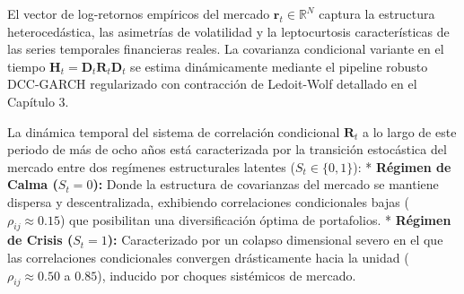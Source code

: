 \documentclass[
  12pt,
]{article}
\begin{document}
El vector de log-retornos empíricos del mercado
\(\mathbf{r}_t \in \mathbb{R}^N\) captura la estructura heterocedástica,
las asimetrías de volatilidad y la leptocurtosis características de las
series temporales financieras reales. La covarianza condicional variante
en el tiempo \(\mathbf{H}_t = \mathbf{D}_t \mathbf{R}_t \mathbf{D}_t\)
se estima dinámicamente mediante el pipeline robusto DCC-GARCH
regularizado con contracción de Ledoit-Wolf detallado en el Capítulo 3.

La dinámica temporal del sistema de correlación condicional
\(\mathbf{R}_t\) a lo largo de este periodo de más de ocho años está
caracterizada por la transición estocástica del mercado entre dos
regímenes estructurales latentes (\(S_t \in \{0, 1\}\)): *
\textbf{Régimen de Calma (\(S_t = 0\)):} Donde la estructura de
covarianzas del mercado se mantiene dispersa y descentralizada,
exhibiendo correlaciones condicionales bajas
(\(\rho_{ij} \approx 0.15\)) que posibilitan una diversificación óptima
de portafolios. * \textbf{Régimen de Crisis (\(S_t = 1\)):}
Caracterizado por un colapso dimensional severo en el que las
correlaciones condicionales convergen drásticamente hacia la unidad
(\(\rho_{ij} \approx 0.50\) a \(0.85\)), inducido por choques sistémicos
de mercado.
\end{document}
